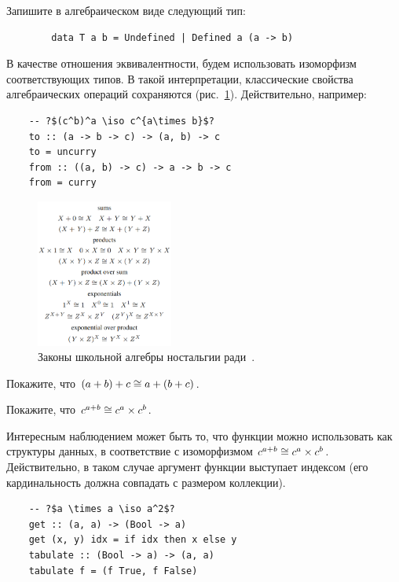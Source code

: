 \begin{task}
    Запишите в алгебраическом виде следующий тип:
    \begin{verbatim}
        data T a b = Undefined | Defined a (a -> b)
    \end{verbatim}
\end{task}

В качестве отношения эквивалентности, будем использовать изоморфизм соответствующих типов.
В такой интерпретации, классические свойства алгебраических операций сохраняются (рис.~\ref{fig:school-alg}).
Действительно, например:
\begin{verbatim}
    -- ?$(c^b)^a \iso c^{a\times b}$?
    to :: (a -> b -> c) -> (a, b) -> c
    to = uncurry
    from :: ((a, b) -> c) -> a -> b -> c
    from = curry
\end{verbatim}

\begin{figure}
    \centering
    \includegraphics[width=0.4\textwidth]{figs/school-alg}
    \caption{Законы школьной алгебры ностальгии ради~\cite{hinze2010reason}.}
    \label{fig:school-alg}
\end{figure}

\begin{task}
    Покажите, что $(a + b) + c \cong a + (b + c)$.
\end{task}

\begin{task}
    Покажите, что $c^{a + b} \cong c^a\times c^b$.
\end{task}

Интересным наблюдением может быть то, что функции можно использовать как структуры данных, в соответствие с изоморфизмом $c^{a + b} \cong c^a\times c^b$.
Действительно, в таком случае аргумент функции выступает индексом (его кардинальность должна совпадать с размером коллекции).
\begin{verbatim}
    -- ?$a \times a \iso a^2$?
    get :: (a, a) -> (Bool -> a)
    get (x, y) idx = if idx then x else y
    tabulate :: (Bool -> a) -> (a, a)
    tabulate f = (f True, f False)
\end{verbatim}


